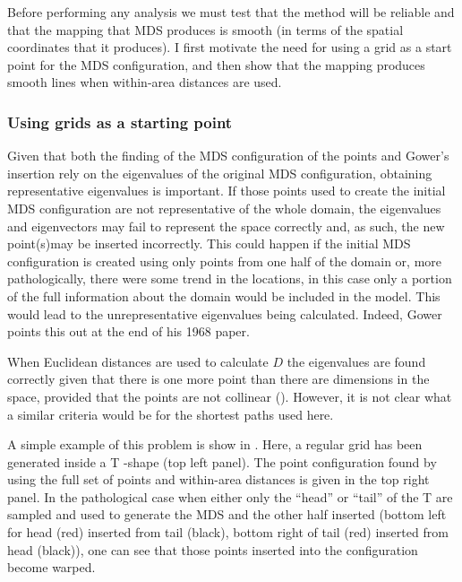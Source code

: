 Before performing any analysis we must test that the method will be reliable and that the mapping that MDS produces is smooth (in terms of the spatial coordinates that it produces). I first motivate the need for using a grid as a start point for the MDS configuration, and then show that the mapping produces smooth lines when within-area distances are used.

\subsubsection{Using grids as a starting point}
\label{grids}
Given that both the finding of the MDS configuration of the points and Gower's insertion rely on the eigenvalues of the original MDS configuration, obtaining representative eigenvalues is important. If those points used to create the initial MDS configuration are not representative of the whole domain, the eigenvalues and eigenvectors may fail to represent the space correctly and, as such, the new point(s)may be inserted incorrectly. This could happen if the initial MDS configuration is created using only points from one half of the domain or, more pathologically, there were some trend in the locations, in this case only a portion of the full information about the domain would be included in the model. This would lead to the unrepresentative eigenvalues being calculated. Indeed, Gower points this out at the end of his 1968 paper.

When Euclidean distances are used to calculate $D$ the eigenvalues are found correctly given that there is one more point than there are dimensions in the space, provided that the points are not collinear (\cite{landmark}). However, it is not clear what a similar criteria would be for the shortest paths used here. 

A simple example of this problem is show in . Here, a regular grid has been generated inside a T -shape (top left panel). The point configuration found by using the full set of points and within-area distances is given in the top right panel. In the pathological case when either only the ``head'' or ``tail'' of the T are sampled and used to generate the MDS and the other half inserted (bottom left for head (red) inserted from tail (black), bottom right of tail (red) inserted from head (black)), one can see that those points inserted into the configuration become warped. 

